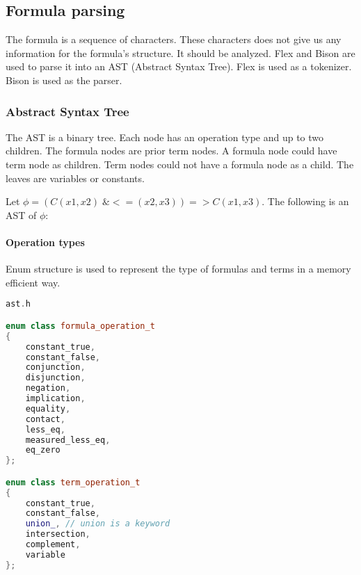 \documentclass{article}
\begin{document}
	\subsection{Formula parsing}
	The formula is a sequence of characters. These characters does not give us any information for the formula's structure. It should be analyzed. Flex \cite{flex-tokenizer} and Bison \cite{bison-parser} are used to parse it into an AST (Abstract Syntax Tree). Flex is used as a tokenizer. Bison is used as the parser.

	\subsubsection{Abstract Syntax Tree}
	The AST is a binary tree. Each node has an operation type and up to two children. The formula nodes are prior term nodes. A formula node could have term node as children. Term nodes could not have a formula node as a child. The leaves are variables or constants.
	
	Let $\phi = (C(x1,x2) \;\& <=(x2, x3)) => C(x1, x3)$. The following is an AST of $\phi$:


	\newpage
	\paragraph{Operation types} Enum structure is used to represent the type of formulas and terms in a memory efficient way.

\begin{lstlisting}[language=C++]
ast.h

enum class formula_operation_t
{
    constant_true,
    constant_false,
    conjunction,
    disjunction,
    negation,
    implication,
    equality,
    contact,
    less_eq,
    measured_less_eq,
    eq_zero
};

enum class term_operation_t
{
    constant_true,
    constant_false,
    union_, // union is a keyword
    intersection,
    complement,
    variable
};
\end{lstlisting}
\end{document}
